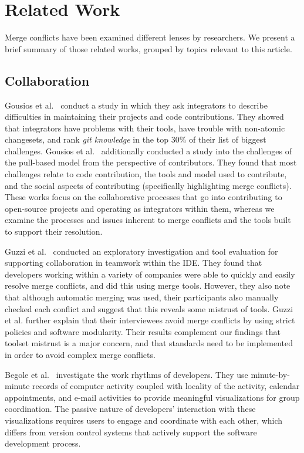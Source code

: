 
\section{Related Work}\label{related_work}

Merge conflicts have been examined different lenses by researchers. We present a brief summary of those related works, grouped by topics relevant to this article.

\subsection{Collaboration}

Gousios et al.~\cite{integrator_perspective} conduct a study in which they ask integrators to describe difficulties in maintaining their projects and code contributions. 
They showed that integrators have problems with their tools, have trouble with non-atomic changesets, and rank \textit{git knowledge} in the top 30\% of their list of biggest challenges. 
Gousios et al.~\cite{gousios2016work} additionally conducted a study into the challenges of the pull-based model from the perspective of contributors. 
They found that most challenges relate to code contribution, the tools and model used to contribute, and the social aspects of contributing (specifically highlighting merge conflicts).
These works focus on the collaborative processes that go into contributing to open-source projects and operating as integrators within them, whereas we examine the processes and issues inherent to merge conflicts and the tools built to support their resolution.

Guzzi et al.~\cite{Guzzi2015} conducted an exploratory investigation and tool evaluation for supporting collaboration in teamwork within the IDE.
They found that developers working within a variety of companies were able to quickly and easily resolve merge conflicts, and did this using merge tools.
However, they also note that although automatic merging was used, their participants also manually checked each conflict and suggest that this reveals some mistrust of tools.
Guzzi et al. further explain that their interviewees avoid merge conflicts by using strict policies and software modularity.
Their results complement our findings that toolset mistrust is a major concern, and that standards need to be implemented in order to avoid complex merge conflicts.

Begole et al.~\cite{begole_work_2002} investigate the work rhythms of developers.
They use minute-by-minute records of computer activity coupled with locality of the activity, calendar appointments, and e-mail activities to provide meaningful visualizations for group coordination.
The passive nature of developers' interaction with these visualizations requires users to engage and coordinate with each other, which differs from version control systems that actively support the software development process.

